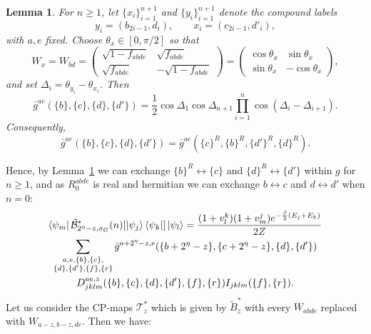 \documentclass[aps,floatfix,10pt,amssymb,amsfont,amsmath,superscriptaddress,float,nofootinbib,longbibliography,nobalancelastpage,twocolumn]{revtex4-2}
\newtheorem{lemma}{Lemma}
\begin{document}
\begin{lemma}
\label{lemma:summed-history-reversal}
For $n\geq1$, let $\{x_i\}_{i=1}^{n+1}$ and $\{y_i\}_{i=1}^{n+1}$ denote
the compound labels
\begin{equation*}
    y_i=(b_{2i-1},d_i),\qquad x_i=(c_{2i-1},d'_i),
\end{equation*}
with $a,e$ fixed.  Choose $\theta_x\in[0,\pi/2]$ so that
\begin{equation*}
    W_x=W_{bd}=\begin{pmatrix}
                \sqrt{1 - f_{abde}} & \sqrt{f_{abde}}\\
       \sqrt{f_{abde}} & -\sqrt{1 - f_{abde}}
    \end{pmatrix}= \begin{pmatrix}\cos\theta_x&\sin\theta_x\\
    \sin\theta_x&-\cos\theta_x\end{pmatrix},
\end{equation*}
and set $\Delta_i=\theta_{y_i}-\theta_{x_i}$.  Then
\begin{equation}
    \bar g^{ae}(\{b\},\{c\},\{d\},\{d'\})
    =\frac12\cos\Delta_1\cos\Delta_{n+1}
      \prod_{i=1}^{n}\cos(\Delta_i-\Delta_{i+1}).
\end{equation}
Consequently,
\begin{equation}
    \bar g^{ae}(\{b\},\{c\},\{d\},\{d'\})
    =\bar g^{ae}(\{c\}^R,\{b\}^R,\{d'\}^R,\{d\}^R).
    \label{eq:PRR}
\end{equation}
\end{lemma}
Hence, by Lemma~\ref{lemma:summed-history-reversal} we can exchange $\{b\}^R \leftrightarrow \{c\}$ and $\{d\}^R \leftrightarrow \{d'\}$ within $g$ for $n\geq 1$, and as $R_0^{abde}$ is real and hermitian we can exchange $b \leftrightarrow c$ and $d \leftrightarrow d'$ when $n=0$:
\begin{multline}
         \bra{\psi_m}\tilde{\mathcal{B}}^*_{2^{\eta}-z,\sigma_G}(n)[\ket{\psi_j}\bra{\psi_k}]\ket{\psi_l} = \frac{(1+v_l^k)(1+v_m^j)e^{-\frac{\beta}{2}(E_j+E_k)}}{2Z}\\\sum_{\substack{a,e,\{b\},\{c\},\\\{d\},\{d'\},\{f\},\{r\}}} \bar g^{a+2^{\eta} -z,e}(\{b+2^{\eta} -z\},\{c+2^{\eta} -z\},\{d\},\{d'\}) 
         \\D^{ae,z}_{jklm}(\{b\},\{c\},\{d\},\{d'\},\{f\},\{r\})I_{jklm}(\{f\},\{r\}).
\end{multline}
Let us consider the CP-maps $\mathcal{T}^*_z$ which is given by $\tilde B^*_z$ with every $W_{abde}$ replaced with $W_{a-z,b-z,de}$. Then we have:
\end{document}

